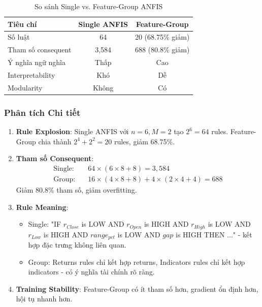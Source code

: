 \documentclass[12pt,a4paper]{article}
\begin{document}
\begin{table}[h]
\centering
\caption{So sánh Single vs. Feature-Group ANFIS}
\begin{tabular}{lcc}
\toprule
\textbf{Tiêu chí} & \textbf{Single ANFIS} & \textbf{Feature-Group} \\
\midrule
Số luật & 64 & 20 (68.75\% giảm) \\
Tham số consequent & 3,584 & 688 (80.8\% giảm) \\
Ý nghĩa ngữ nghĩa & Thấp & Cao \\
Interpretability & Khó & Dễ \\
Modularity & Không & Có \\
\bottomrule
\end{tabular}
\end{table}

\subsubsection{Phân tích Chi tiết}

\begin{enumerate}
    \item \textbf{Rule Explosion}: Single ANFIS với $n=6, M=2$ tạo $2^6=64$ rules. Feature-Group chia thành $2^4+2^2=20$ rules, giảm 68.75\%.
    
    \item \textbf{Tham số Consequent}: 
    \begin{align}
    \text{Single}: &\quad 64 \times (6 \times 8 + 8) = 3,584 \\
    \text{Group}: &\quad 16 \times (4 \times 8 + 8) + 4 \times (2 \times 4 + 4) = 688
    \end{align}
    Giảm 80.8\% tham số, giảm overfitting.
    
    \item \textbf{Rule Meaning}: 
    \begin{itemize}
        \item Single: "IF $r_{Close}$ is LOW AND $r_{Open}$ is HIGH AND $r_{High}$ is LOW AND $r_{Low}$ is HIGH AND $range_{pct}$ is LOW AND $gap$ is HIGH THEN ..." - kết hợp đặc trưng không liên quan.
        \item Group: Returns rules chỉ kết hợp returns, Indicators rules chỉ kết hợp indicators - có ý nghĩa tài chính rõ ràng.
    \end{itemize}
    
    \item \textbf{Training Stability}: Feature-Group có ít tham số hơn, gradient ổn định hơn, hội tụ nhanh hơn.
\end{enumerate}
\end{document}
